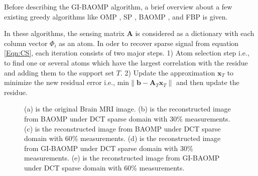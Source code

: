 \documentclass[11pt,conference]{IEEEtran}
\begin{document}
\par Before describing the GI-BAOMP algorithm, a brief overview about a few existing greedy algorithms like OMP \cite{omp}, SP \cite{sp}, BAOMP \cite{baomp}, and FBP \cite{fbp} is given.

\par In these algorithms, the sensing matrix $\mathbf{A}$ is considered as a dictionary with each column vector $\Phi_i$ as an atom. In oder to recover sparse signal from equation \eqref{Eqn:CS}, each iteration consists of two major steps. 1) Atom selection step i.e., to find one or several atoms which have the largest correlation with the residue and adding them to the support set $T$. 2) Update the approximation $\mathbf{x}_T$ to minimize the new residual error i.e., min$\|\mathbf{b}-\mathbf{A}_T\mathbf{x}_T\|$ and then update the residue. 


\begin{figure*}
\begin{center}
\hspace{-0.4in} %

\hspace{-0.4in} %
\hspace{-0.4in}
 
\end{center}
\caption{(a) is the original Brain MRI image. (b) is the reconstructed image from BAOMP under DCT sparse domain with 30\% measurements. (c) is the reconstructed image from BAOMP under DCT sparse domain with 60\% measurements. (d) is the reconstructed image from GI-BAOMP under DCT sparse domain with 30\% measurements. (e) is the reconstructed image from GI-BAOMP under DCT sparse domain with 60\% measurements.}
\end{figure*}
\end{document}
